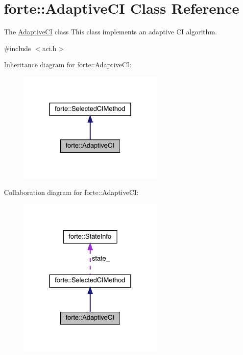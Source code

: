 \hypertarget{classforte_1_1_adaptive_c_i}{}\section{forte\+:\+:Adaptive\+CI Class Reference}
\label{classforte_1_1_adaptive_c_i}


The \mbox{\hyperlink{classforte_1_1_adaptive_c_i}{Adaptive\+CI}} class This class implements an adaptive CI algorithm.  




{\ttfamily \#include $<$aci.\+h$>$}



Inheritance diagram for forte\+:\+:Adaptive\+CI\+:
\nopagebreak
\begin{figure}[H]
\begin{center}
\leavevmode
\includegraphics[width=204pt]{classforte_1_1_adaptive_c_i__inherit__graph}
\end{center}
\end{figure}


Collaboration diagram for forte\+:\+:Adaptive\+CI\+:
\nopagebreak
\begin{figure}[H]
\begin{center}
\leavevmode
\includegraphics[width=204pt]{classforte_1_1_adaptive_c_i__coll__graph}
\end{center}
\end{figure}
